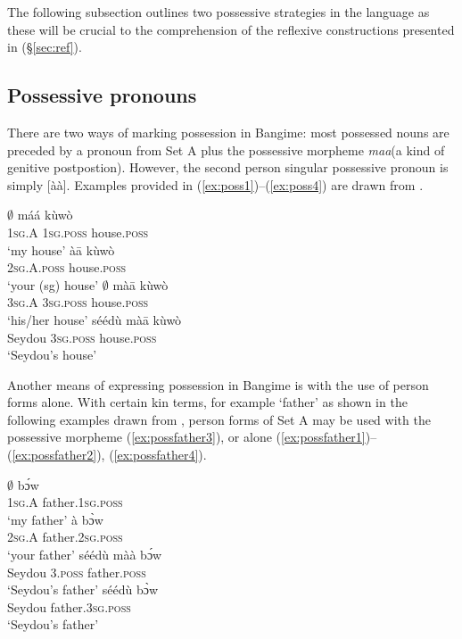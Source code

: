 \documentclass[output=paper]{langscibook}
\begin{document}
The following subsection outlines two possessive strategies in the language as these will be crucial to the comprehension of the reflexive constructions presented in (\S \ref{sec:ref}).

\subsection{Possessive pronouns}
\label{subsec:possp}
There are two ways of marking possession in Bangime: most possessed nouns are preceded by a pronoun from Set A plus the possessive morpheme \textit{maa}(a kind of genitive postpostion). However, the second person singular possessive pronoun is simply [àà]. Examples provided in (\ref{ex:poss1})--(\ref{ex:poss4}) are drawn from \cite[57]{HantganHeath2018}.
\begin{multicols}{2}
\ea \label{ex:poss1}
\gll $\emptyset$ máá kùwò \\
1\textsc{sg}.A 1\textsc{sg}.\textsc{poss} house.\textsc{poss}\\
\glt `my house'
\z
\ea \label{ex:poss2}
\gll àā kùwò \\
2\textsc{sg}.A.\textsc{poss} house.\textsc{poss}\\
\glt `your (sg) house'
\z
\ea \label{ex:poss3}
\gll $\emptyset$ màā kùwò \\
3\textsc{sg}.A 3\textsc{sg}.\textsc{poss} house.\textsc{poss}\\
\glt `his/her house'
\z
\ea \label{ex:poss4}
\gll séédù màā kùwò \\
Seydou 3\textsc{sg}.\textsc{poss} house.\textsc{poss}\\
\glt `Seydou's house'
\z
\end{multicols}
Another means of expressing possession in Bangime is with the use of person forms alone. With certain kin terms, for example `father' as shown in the following examples drawn from \cite[58--59]{HantganHeath2018}, person forms of Set A may be used with the possessive morpheme (\ref{ex:possfather3}), or alone (\ref{ex:possfather1})--(\ref{ex:possfather2}), (\ref{ex:possfather4}).    
\begin{multicols}{2}
	\ea \label{ex:possfather1}
	\gll $\emptyset$ bɔ́w \\
	1\textsc{sg}.A father.1\textsc{sg}.\textsc{poss} \\
	\glt `my father'
	\z
	\ea \label{ex:possfather2}
	\gll à bɔ̀w \\
	2\textsc{sg}.A father.2\textsc{sg}.\textsc{poss}\\
	\glt `your father'
	\z
	\ea \label{ex:possfather3}
	\gll séédù màà bɔ́w \\
	Seydou 3.\textsc{poss} father.\textsc{poss} \\
	\glt `Seydou's father'
	\z
	\ea \label{ex:possfather4}
	\gll séédù bɔ̀w \\
	Seydou father.3\textsc{sg}.\textsc{poss} \\
	\glt `Seydou's father'
	\z
\end{multicols}
\end{document}
